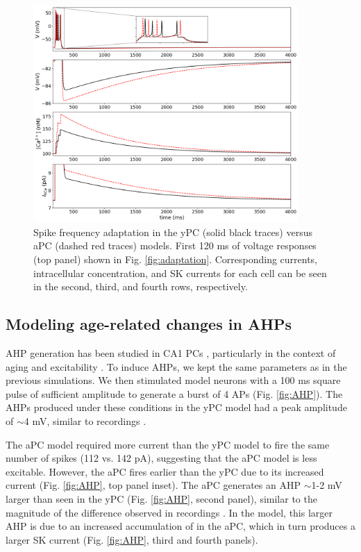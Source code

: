 \documentclass[12pt]{article}
\begin{document}
\begin{figure}[h!]
\centering
\includegraphics[width=0.9\textwidth]{figures/fig2.png}
\caption{Spike frequency adaptation in the yPC (solid black traces) versus aPC (dashed red traces) models. First 120 ms of voltage responses (top panel) shown in Fig. \ref{fig:adaptation}. Corresponding {\Ca} currents, intracellular {\Ca} concentration, and SK currents for each cell can be seen in the second, third, and fourth rows, respectively.}
\label{fig:adaptzoom}
\end{figure}

\subsection{Modeling age-related changes in AHPs}

AHP generation has been studied in CA1 PCs \citep{storm1989after,storm1990potassium,gu2005kv7}, particularly in the context of aging and excitability \cite{bodhinathan2010redox,blalock2010effects,disterhoft1996calcium,gant2006early,gant2009action,kaczorowski2009memory,matthews2009fast,power2002age,moyer1992nimodipine}. To induce AHPs, we kept the same parameters as in the previous simulations. We then stimulated model neurons with a 100 ms square pulse of sufficient amplitude to generate a burst of 4 APs (Fig. \ref{fig:AHP}). The AHPs produced under these conditions in the yPC model had a peak amplitude of $\sim$4 mV, similar to recordings \citep{kaczorowski2007stability,matthews2009fast,power2002age}.

The aPC model required more current than the yPC model to fire the same number of spikes (112 vs. 142 pA), suggesting that the aPC model is less excitable. However, the aPC fires earlier than the yPC due to its increased {\Ca} current (Fig. \ref{fig:AHP}, top panel inset). The aPC generates an AHP  $\sim$1-2 mV larger than seen in the yPC (Fig. \ref{fig:AHP}, second panel), similar to the magnitude of the difference observed in recordings \citep{moyer1992nimodipine,blalock2010effects,gant2006early,power2002age}. In the model, this larger AHP is due to an increased accumulation of {\Ca} in the aPC, which in turn produces a larger SK current (Fig. \ref{fig:AHP}, third and fourth panels).
\end{document}
